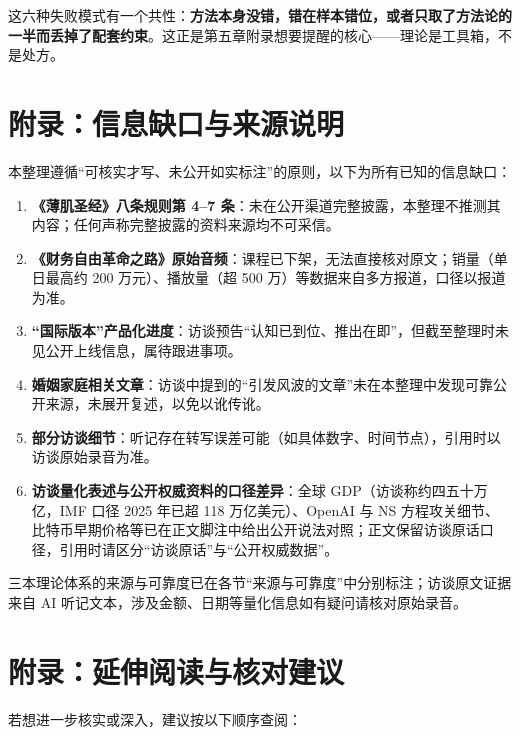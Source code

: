 这六种失败模式有一个共性：\textbf{方法本身没错，错在样本错位，或者只取了方法论的一半而丢掉了配套约束}。这正是第五章附录想要提醒的核心------理论是工具箱，不是处方。

\section{附录：信息缺口与来源说明}

本整理遵循``可核实才写、未公开如实标注''的原则，以下为所有已知的信息缺口：

\begin{enumerate}
\def\labelenumi{\arabic{enumi}.}
\tightlist
\item
  \textbf{《薄肌圣经》八条规则第 4--7
  条}：未在公开渠道完整披露，本整理不推测其内容；任何声称完整披露的资料来源均不可采信。
\item
  \textbf{《财务自由革命之路》原始音频}：课程已下架，无法直接核对原文；销量（单日最高约
  200 万元）、播放量（超 500 万）等数据来自多方报道，口径以报道为准。
\item
  \textbf{``国际版本''产品化进度}：访谈预告``认知已到位、推出在即''，但截至整理时未见公开上线信息，属待跟进事项。
\item
  \textbf{婚姻家庭相关文章}：访谈中提到的``引发风波的文章''未在本整理中发现可靠公开来源，未展开复述，以免以讹传讹。
\item
  \textbf{部分访谈细节}：听记存在转写误差可能（如具体数字、时间节点），引用时以访谈原始录音为准。
\item
  \textbf{访谈量化表述与公开权威资料的口径差异}：全球
  GDP（访谈称约四五十万亿，IMF 口径 2025 年已超 118 万亿美元）、OpenAI
  与 NS
  方程攻关细节、比特币早期价格等已在正文脚注中给出公开说法对照；正文保留访谈原话口径，引用时请区分``访谈原话''与``公开权威数据''。
\end{enumerate}

三本理论体系的来源与可靠度已在各节``来源与可靠度''中分别标注；访谈原文证据来自
AI 听记文本，涉及金额、日期等量化信息如有疑问请核对原始录音。

\section{附录：延伸阅读与核对建议}

若想进一步核实或深入，建议按以下顺序查阅：

